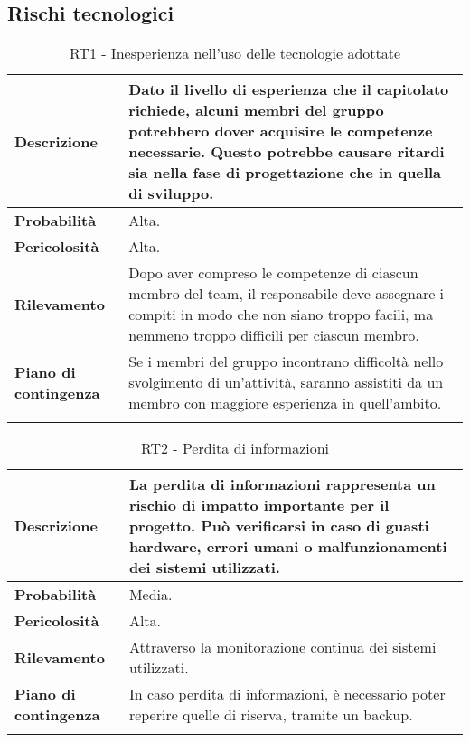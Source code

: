 \newpage


\subsection{Rischi tecnologici}
\begin{longtable}{ | l | p{10cm} | }
    \hline
    \textbf{Descrizione} & Dato il livello di esperienza che il capitolato richiede,  alcuni membri del gruppo potrebbero dover acquisire le competenze necessarie. Questo potrebbe causare ritardi sia nella fase di progettazione che in quella di sviluppo.  \\
    \hline
    \textbf{Probabilità} & Alta. \\
    \hline
    \textbf{Pericolosità} & Alta. \\
    \hline
    \textbf{Rilevamento} & Dopo aver compreso le competenze di ciascun membro del team, il responsabile deve assegnare i compiti in modo che non siano troppo facili, ma nemmeno troppo difficili per ciascun membro. \\
    \hline
    \textbf{Piano di contingenza} & Se i membri del gruppo incontrano difficoltà nello svolgimento di un'attività, saranno assistiti da un membro con maggiore esperienza in quell'ambito. \\
    \hline
    \caption{RT1 - Inesperienza nell'uso delle tecnologie adottate}
    \label{table:5}
\end{longtable}

\begin{longtable}{ | l | p{10cm} | }
    \hline
    \textbf{Descrizione} & La perdita di informazioni rappresenta un rischio di impatto importante per il progetto. Può verificarsi in caso di guasti hardware, errori umani o malfunzionamenti dei sistemi utilizzati. \\
    \hline
    \textbf{Probabilità} & Media. \\
    \hline
    \textbf{Pericolosità} & Alta. \\
    \hline
    \textbf{Rilevamento} & Attraverso la monitorazione continua dei sistemi utilizzati. \\
    \hline
    \textbf{Piano di contingenza} & In caso perdita di informazioni, è necessario poter reperire quelle di riserva, tramite un backup. \\
    \hline
    \caption{RT2 - Perdita di informazioni}
    \label{table:6}
\end{longtable}
\newpage

